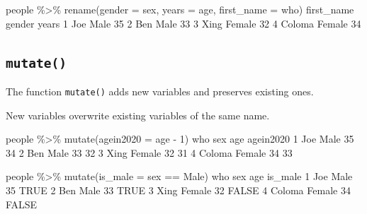 \documentclass[
]{book}
\newenvironment{Shaded}{\begin{snugshade}}{\end{snugshade}}
\newcommand{\AttributeTok}[1]{\textcolor[rgb]{0.77,0.63,0.00}{#1}}
\newcommand{\ConstantTok}[1]{\textcolor[rgb]{0.00,0.00,0.00}{#1}}
\newcommand{\DecValTok}[1]{\textcolor[rgb]{0.00,0.00,0.81}{#1}}
\newcommand{\FunctionTok}[1]{\textcolor[rgb]{0.00,0.00,0.00}{#1}}
\newcommand{\NormalTok}[1]{#1}
\newcommand{\SpecialCharTok}[1]{\textcolor[rgb]{0.00,0.00,0.00}{#1}}
\newcommand{\StringTok}[1]{\textcolor[rgb]{0.31,0.60,0.02}{#1}}
\begin{document}
\begin{Shaded}
\begin{Highlighting}[]
\NormalTok{people }\SpecialCharTok{\%\textgreater{}\%} \FunctionTok{rename}\NormalTok{(}\AttributeTok{gender =}\NormalTok{ sex, }\AttributeTok{years =}\NormalTok{ age, }\AttributeTok{first\_name =}\NormalTok{ who)}
\NormalTok{  first\_name gender years}
\DecValTok{1}\NormalTok{        Joe   Male    }\DecValTok{35}
\DecValTok{2}\NormalTok{        Ben   Male    }\DecValTok{33}
\DecValTok{3}\NormalTok{       Xing Female    }\DecValTok{32}
\DecValTok{4}\NormalTok{     Coloma Female    }\DecValTok{34}
\end{Highlighting}
\end{Shaded}

\hypertarget{mutate}{%
\subsection*{\texorpdfstring{\texttt{mutate()}}{mutate()}}\label{mutate}}

The function \texttt{mutate()} adds new variables and preserves existing ones.

New variables overwrite existing variables of the same name.

\begin{Shaded}
\begin{Highlighting}[]
\NormalTok{people }\SpecialCharTok{\%\textgreater{}\%} \FunctionTok{mutate}\NormalTok{(}\AttributeTok{agein2020 =}\NormalTok{ age }\SpecialCharTok{{-}} \DecValTok{1}\NormalTok{)}
\NormalTok{     who    sex age agein2020}
\DecValTok{1}\NormalTok{    Joe   Male  }\DecValTok{35}        \DecValTok{34}
\DecValTok{2}\NormalTok{    Ben   Male  }\DecValTok{33}        \DecValTok{32}
\DecValTok{3}\NormalTok{   Xing Female  }\DecValTok{32}        \DecValTok{31}
\DecValTok{4}\NormalTok{ Coloma Female  }\DecValTok{34}        \DecValTok{33}
\end{Highlighting}
\end{Shaded}

\begin{Shaded}
\begin{Highlighting}[]
\NormalTok{people }\SpecialCharTok{\%\textgreater{}\%} \FunctionTok{mutate}\NormalTok{(}\AttributeTok{is\_male =}\NormalTok{ sex }\SpecialCharTok{==} \StringTok{\textquotesingle{}Male\textquotesingle{}}\NormalTok{)}
\NormalTok{     who    sex age is\_male}
\DecValTok{1}\NormalTok{    Joe   Male  }\DecValTok{35}    \ConstantTok{TRUE}
\DecValTok{2}\NormalTok{    Ben   Male  }\DecValTok{33}    \ConstantTok{TRUE}
\DecValTok{3}\NormalTok{   Xing Female  }\DecValTok{32}   \ConstantTok{FALSE}
\DecValTok{4}\NormalTok{ Coloma Female  }\DecValTok{34}   \ConstantTok{FALSE}
\end{Highlighting}
\end{Shaded}
\end{document}
